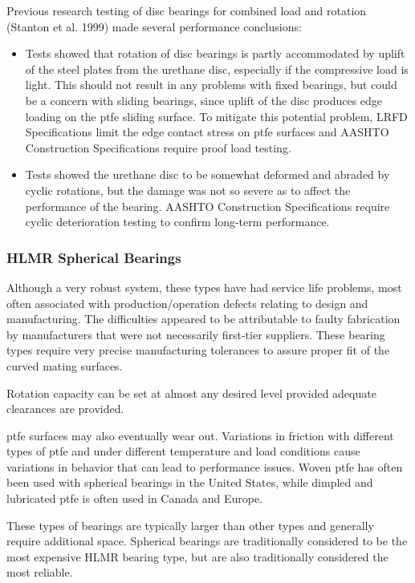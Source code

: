 Previous research testing of disc bearings for combined load and rotation (Stanton et al. 1999) made several
performance conclusions:

\begin{itemize}
  \item Tests showed that rotation of disc bearings is partly accommodated by uplift of the steel plates from the
  urethane disc, especially if the compressive load is light. This should not result in any problems with fixed
  bearings, but could be a concern with sliding bearings, since uplift of the disc produces edge loading on the
  \acrshort{ptfe} sliding surface. To mitigate this potential problem, LRFD Specifications limit the edge contact stress
  on \acrshort{ptfe} surfaces and AASHTO Construction Specifications require proof load testing.
  \item Tests showed the urethane disc to be somewhat deformed and abraded by cyclic rotations, but the damage
  was not so severe as to affect the performance of the bearing. AASHTO Construction Specifications require
  cyclic deterioration testing to confirm long-term performance.
\end{itemize}


\subsubsection{HLMR Spherical Bearings}
Although a very robust system, these types have had service life problems, most often associated with
production/operation defects relating to design and manufacturing. The difficulties appeared to be attributable to
faulty fabrication by manufacturers that were not necessarily first-tier suppliers. These bearing types require very
precise manufacturing tolerances to assure proper fit of the curved mating surfaces.

Rotation capacity can be set at almost any desired level provided adequate clearances are provided.

\acrshort{ptfe} surfaces may also eventually wear out. Variations in friction with different types of \acrshort{ptfe} and under
different temperature and load conditions cause variations in behavior that can lead to performance issues. Woven
\acrshort{ptfe} has often been used with spherical bearings in the United States, while dimpled and lubricated \acrshort{ptfe} is often
used in Canada and Europe.

These types of bearings are typically larger than other types and generally require additional space. Spherical
bearings are traditionally considered to be the most expensive HLMR bearing type, but are also traditionally
considered the most reliable.

